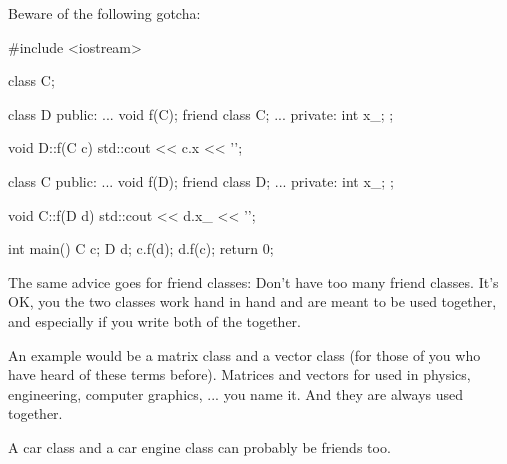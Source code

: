 Beware of the following gotcha:

\begin{consolethree}[escapeinside=||]
#include <iostream>

class C;

class D
{
public:
    ...
    void f(C);
    friend class C;
    ...
private:
    int x_;
};

void D::f(C c)
{
    std::cout << c.x << '\n';
}

class C
{
public:
    ...
    void f(D);
    friend class D;
    ...
private:
    int x_;
};

void C::f(D d)
{
    std::cout << d.x_ << '\n';
}

int main()
{
    C c;
    D d;
    c.f(d);
    d.f(c);
    return 0;
}
\end{consolethree}

The same advice goes for friend classes: Don't have too many friend
classes. It's OK, you the two classes work hand in hand and are meant
to be used together, and especially if you write both of the together.

An example would be a matrix class and a vector class (for those of you
who have heard of these terms before). Matrices and vectors for used in
physics, engineering, computer graphics, ... you name it. And they are
always used together.

A car class and a car engine class can probably be friends too.


